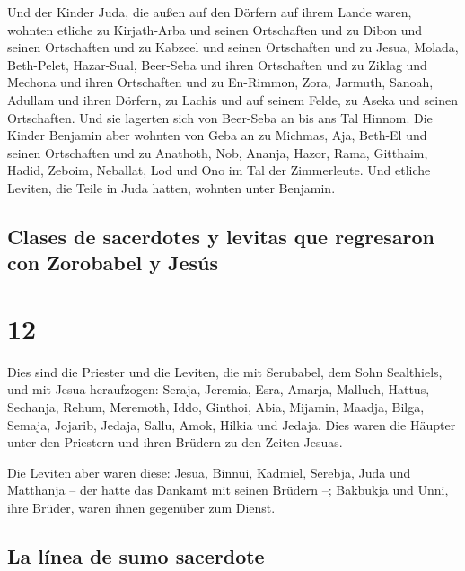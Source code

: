  Und der Kinder Juda, die außen auf den Dörfern auf ihrem
Lande waren, wohnten etliche zu Kirjath-Arba und seinen Ortschaften und
zu Dibon und seinen Ortschaften und zu Kabzeel und seinen Ortschaften
 und zu Jesua, Molada, Beth-Pelet, 
Hazar-Sual, Beer-Seba und ihren Ortschaften  und zu
Ziklag und Mechona und ihren Ortschaften  und zu
En-Rimmon, Zora, Jarmuth,  Sanoah, Adullam und ihren
Dörfern, zu Lachis und auf seinem Felde, zu Aseka und seinen
Ortschaften. Und sie lagerten sich von Beer-Seba an bis ans Tal Hinnom.
 Die Kinder Benjamin aber wohnten von Geba an zu Michmas,
Aja, Beth-El und seinen Ortschaften  und zu Anathoth,
Nob, Ananja,  Hazor, Rama, Gitthaim, 
Hadid, Zeboim, Neballat,  Lod und Ono im Tal der
Zimmerleute.  Und etliche Leviten, die Teile in Juda
hatten, wohnten unter Benjamin.

\hypertarget{clases-de-sacerdotes-y-levitas-que-regresaron-con-zorobabel-y-jesuxfas}{%
\subsection{Clases de sacerdotes y levitas que regresaron con Zorobabel
y
Jesús}\label{clases-de-sacerdotes-y-levitas-que-regresaron-con-zorobabel-y-jesuxfas}}

\hypertarget{section-11}{%
\section{12}\label{section-11}}

 Dies sind die Priester und die Leviten, die mit
Serubabel, dem Sohn Sealthiels, und mit Jesua heraufzogen: Seraja,
Jeremia, Esra,  Amarja, Malluch, Hattus, 
Sechanja, Rehum, Meremoth,  Iddo, Ginthoi, Abia,
 Mijamin, Maadja, Bilga,  Semaja, Jojarib,
Jedaja,  Sallu, Amok, Hilkia und Jedaja. Dies waren die
Häupter unter den Priestern und ihren Brüdern zu den Zeiten Jesuas.

 Die Leviten aber waren diese: Jesua, Binnui, Kadmiel,
Serebja, Juda und Matthanja -- der hatte das Dankamt mit seinen Brüdern
--;  Bakbukja und Unni, ihre Brüder, waren ihnen gegenüber
zum Dienst.

\hypertarget{la-luxednea-de-sumo-sacerdote}{%
\subsection{La línea de sumo
sacerdote}\label{la-luxednea-de-sumo-sacerdote}}

